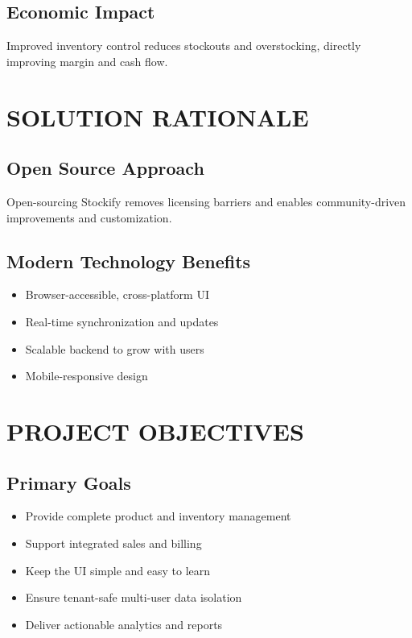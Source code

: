 \subsection{Economic Impact}

Improved inventory control reduces stockouts and overstocking, directly improving margin and cash flow.

\section{SOLUTION RATIONALE}

\subsection{Open Source Approach}

Open-sourcing Stockify removes licensing barriers and enables community-driven improvements and customization.

\subsection{Modern Technology Benefits}
\begin{itemize}
\item Browser-accessible, cross-platform UI
\item Real-time synchronization and updates
\item Scalable backend to grow with users
\item Mobile-responsive design
\end{itemize}

\section{PROJECT OBJECTIVES}

\subsection{Primary Goals}
\begin{itemize}
\item Provide complete product and inventory management
\item Support integrated sales and billing
\item Keep the UI simple and easy to learn
\item Ensure tenant-safe multi-user data isolation
\item Deliver actionable analytics and reports
\end{itemize}

